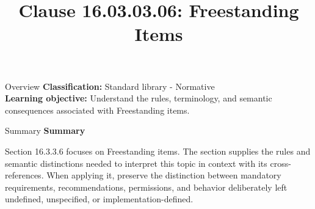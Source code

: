 \documentclass[10pt,letterpaper]{article}
\title{Clause 16.03.03.06: Freestanding Items}
\author{}
\date{}
\begin{document}
\maketitle
\begin{CornellOverviewBox}{Overview}
\textbf{Classification:} Standard library - Normative\\[2pt]
\textbf{Learning objective:} Understand the rules, terminology, and semantic consequences associated with Freestanding items.
\end{CornellOverviewBox}\begin{CornellSummaryBox}{Summary}
{\sffamily\bfseries\color{Accent} Summary}\par\vspace{3pt}Section 16.3.3.6 focuses on Freestanding items. The section supplies the rules and semantic distinctions needed to interpret this topic in context with its cross-references. When applying it, preserve the distinction between mandatory requirements, recommendations, permissions, and behavior deliberately left undefined, unspecified, or implementation-defined.
\end{CornellSummaryBox}
\end{document}
